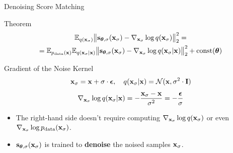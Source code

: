 \documentclass{beamer}
\begin{document}
\begin{frame}{Denoising Score Matching}
	\begin{block}{Theorem}
		\vspace{-0.5cm}
		\begin{multline*}
			\mathbb{E}_{q(\mathbf{x}_{\sigma})}\big\| \mathbf{s}_{\boldsymbol{\theta}, \sigma}(\mathbf{x}_{\sigma}) - \nabla_{\mathbf{x}_{\sigma}} \log q(\mathbf{x}_{\sigma}) \big\|^2_2 = \\
		= \mathbb{E}_{p_{\text{data}}(\mathbf{x})} \mathbb{E}_{q(\mathbf{x}_{\sigma} | \mathbf{x})}\big\| \mathbf{s}_{\boldsymbol{\theta}, \sigma}(\mathbf{x}_{\sigma}) - \nabla_{\mathbf{x}_{\sigma}} \log q(\mathbf{x}_{\sigma} | \mathbf{x}) \big\|^2_2 + \text{const}(\boldsymbol{\theta})
		\end{multline*}
		\vspace{-0.5cm}
	\end{block}
	\eqpause
	\begin{block}{Gradient of the Noise Kernel}
		\vspace{-0.3cm}
		\[
			\mathbf{x}_{\sigma} = \mathbf{x} + \sigma \cdot \boldsymbol{\epsilon}, \quad q(\mathbf{x}_{\sigma} | \mathbf{x}) = \mathcal{N}(\mathbf{x}, \sigma^2 \cdot \mathbf{I})
		\]
		\eqpause
		\vspace{-0.3cm}
		\[
			\nabla_{\mathbf{x}_{\sigma}} \log q(\mathbf{x}_{\sigma} | \mathbf{x}) = - \frac{\mathbf{x}_{\sigma} - \mathbf{x}}{\sigma^2}  = - \frac{\boldsymbol{\epsilon}}{\sigma}
		\]
		\eqpause
		\vspace{-0.5cm}
	\end{block}
	\begin{itemize}
		\item The right-hand side doesn't require computing $\nabla_{\mathbf{x}_{\sigma}} \log q(\mathbf{x}_{\sigma})$ or even $\nabla_{\mathbf{x}_{\sigma}} \log p_{\text{data}}(\mathbf{x}_{\sigma})$.
		\item $\mathbf{s}_{\boldsymbol{\theta}, \sigma}(\mathbf{x}_{\sigma})$ is trained to \textbf{denoise} the noised samples $\mathbf{x}_{\sigma}$.
	\end{itemize}
\end{frame}
\end{document}
